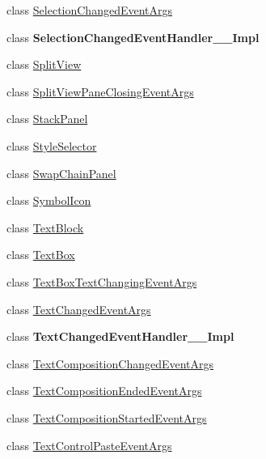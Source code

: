 \begin{DoxyCompactItemize}
\item 
class \hyperlink{class_windows_1_1_u_i_1_1_xaml_1_1_controls_1_1_selection_changed_event_args}{Selection\+Changed\+Event\+Args}
\item 
class {\bfseries Selection\+Changed\+Event\+Handler\+\_\+\+\_\+\+Impl}
\item 
class \hyperlink{class_windows_1_1_u_i_1_1_xaml_1_1_controls_1_1_split_view}{Split\+View}
\item 
class \hyperlink{class_windows_1_1_u_i_1_1_xaml_1_1_controls_1_1_split_view_pane_closing_event_args}{Split\+View\+Pane\+Closing\+Event\+Args}
\item 
class \hyperlink{class_windows_1_1_u_i_1_1_xaml_1_1_controls_1_1_stack_panel}{Stack\+Panel}
\item 
class \hyperlink{class_windows_1_1_u_i_1_1_xaml_1_1_controls_1_1_style_selector}{Style\+Selector}
\item 
class \hyperlink{class_windows_1_1_u_i_1_1_xaml_1_1_controls_1_1_swap_chain_panel}{Swap\+Chain\+Panel}
\item 
class \hyperlink{class_windows_1_1_u_i_1_1_xaml_1_1_controls_1_1_symbol_icon}{Symbol\+Icon}
\item 
class \hyperlink{class_windows_1_1_u_i_1_1_xaml_1_1_controls_1_1_text_block}{Text\+Block}
\item 
class \hyperlink{class_windows_1_1_u_i_1_1_xaml_1_1_controls_1_1_text_box}{Text\+Box}
\item 
class \hyperlink{class_windows_1_1_u_i_1_1_xaml_1_1_controls_1_1_text_box_text_changing_event_args}{Text\+Box\+Text\+Changing\+Event\+Args}
\item 
class \hyperlink{class_windows_1_1_u_i_1_1_xaml_1_1_controls_1_1_text_changed_event_args}{Text\+Changed\+Event\+Args}
\item 
class {\bfseries Text\+Changed\+Event\+Handler\+\_\+\+\_\+\+Impl}
\item 
class \hyperlink{class_windows_1_1_u_i_1_1_xaml_1_1_controls_1_1_text_composition_changed_event_args}{Text\+Composition\+Changed\+Event\+Args}
\item 
class \hyperlink{class_windows_1_1_u_i_1_1_xaml_1_1_controls_1_1_text_composition_ended_event_args}{Text\+Composition\+Ended\+Event\+Args}
\item 
class \hyperlink{class_windows_1_1_u_i_1_1_xaml_1_1_controls_1_1_text_composition_started_event_args}{Text\+Composition\+Started\+Event\+Args}
\item 
class \hyperlink{class_windows_1_1_u_i_1_1_xaml_1_1_controls_1_1_text_control_paste_event_args}{Text\+Control\+Paste\+Event\+Args}

\end{DoxyCompactItemize}
